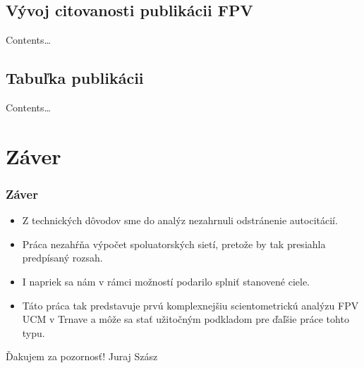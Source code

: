 \documentclass{beamer}
\begin{document}
\subsection{Vývoj citovanosti publikácii FPV}


\begin{frame}


Contents\dots


\end{frame}


\subsection{Tabuľka publikácii}


\begin{frame}


Contents\dots


\end{frame}


\section{Záver}

\begin{frame}
\frametitle{Záver}

\begin{itemize}
\item<1-> Z technických dôvodov sme do analýz nezahrnuli odstránenie
  autocitácií.
\item<2-> Práca nezahŕňa výpočet spoluatorských sietí, pretože by tak presiahla
  predpísaný rozsah.
\item<3-> I napriek sa nám v rámci možností podarilo splniť stanovené ciele.
\item<4-> Táto práca tak predstavuje prvú komplexnejšiu scientometrickú analýzu
  FPV UCM v Trnave a môže sa stať užitočným podkladom pre ďaľšie práce tohto
  typu.
\end{itemize}

\end{frame}


\begin{frame}[plain]
  \begin{center}
    \Huge Ďakujem za pozornosť!
    \vfill
    \Large Juraj Szász
  \end{center}
\end{frame}
\end{document}

